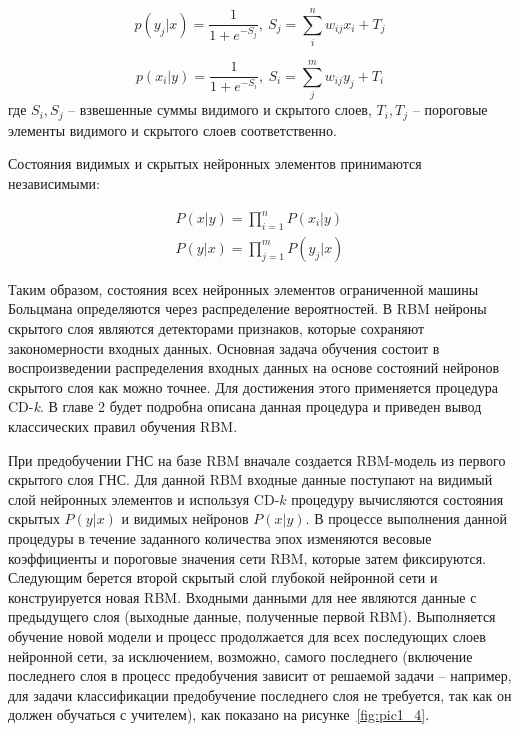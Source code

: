 \begin{equation}
	p(y_j\lvert x)=\frac{1}{1+e^{-S_j}},\ S_j=\sum_i^n w_{ij}x_i+T_j
\end{equation}
	
\begin{equation}
	p(x_i\lvert y)=\frac{1}{1+e^{-S_i}},\ S_i=\sum_j^m w_{ij}y_j+T_i
\end{equation}
где $S_i, S_j$ -- взвешенные суммы видимого и скрытого слоев, $T_i, T_j$ -- пороговые элементы видимого и скрытого слоев соответственно.
	
Состояния видимых и скрытых нейронных элементов принимаются независимыми:
	
\begin{equation*}
\begin{aligned}
	P(x \lvert y) = \prod_{i=1}^n P(x_i \lvert y)\\
	P(y \lvert x) = \prod_{j=1}^m P(y_j \lvert x)
\end{aligned}	
\end{equation*}
	
Таким образом, состояния всех нейронных элементов ограниченной машины Больцмана определяются через распределение вероятностей. В RBM нейроны скрытого слоя являются детекторами признаков, которые сохраняют закономерности входных данных. Основная задача обучения состоит в воспроизведении распределения входных данных на основе состояний нейронов скрытого слоя как можно точнее. Для достижения этого применяется процедура CD-\textit{k}. В главе 2 будет подробна описана данная процедура и приведен вывод классических правил обучения RBM. %

При предобучении ГНС на базе RBM вначале создается RBM-модель из первого скрытого слоя ГНС. Для данной RBM входные данные поступают на видимый слой нейронных элементов и используя CD-$k$ процедуру вычисляются состояния скрытых $P(y \lvert x)$ и видимых нейронов $P(x \lvert y)$. В процессе выполнения данной процедуры в течение заданного количества эпох изменяются весовые коэффициенты и пороговые значения сети RBM, которые затем фиксируются. Следующим берется второй скрытый слой глубокой нейронной сети и конструируется новая RBM. Входными данными для нее являются данные с предыдущего слоя (выходные данные, полученные первой RBM). Выполняется обучение новой модели и процесс продолжается для всех последующих слоев нейронной сети, за исключением, возможно, самого последнего (включение последнего слоя в процесс предобучения зависит от решаемой задачи -- например, для задачи классификации предобучение последнего слоя не требуется, так как он должен обучаться с учителем), как показано на рисунке~\ref{fig:pic1_4}. 

